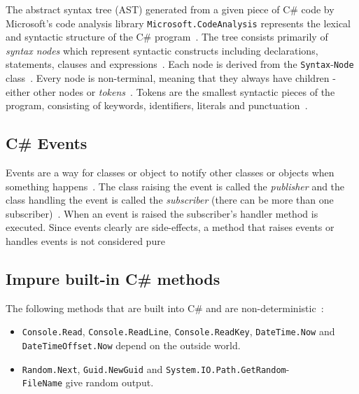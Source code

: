 \documentclass[a4paper,12pt]{article}
\begin{document}
The abstract syntax tree (AST) generated from a given piece of C\# code by Microsoft's code analysis library \texttt{Microsoft.CodeAnalysis} represents the lexical and syntactic structure of the C\# program~\cite{microsoft-work-with-syntax}. The tree consists primarily of \textit{syntax nodes} which represent syntactic constructs including declarations, statements, clauses and expressions~\cite{microsoft-work-with-syntax}. Each node is derived from the \texttt{Syntax}-\texttt{Node} class~\cite{microsoft-work-with-syntax}. Every node is non-terminal, meaning that they always have children - either other nodes or \textit{tokens}~\cite{microsoft-work-with-syntax}. Tokens are the smallest syntactic pieces of the program, consisting of keywords, identifiers, literals and punctuation~\cite{microsoft-work-with-syntax}.


\subsection{C\# Events} \label{sub:Events}
Events are a way for classes or object to notify other classes or objects when something happens~\cite{microsoft-events}. The class raising the event is called the \textit{publisher} and the class handling the event is called the \textit{subscriber} (there can be more than one subscriber)~\cite{microsoft-events}. When an event is raised the subscriber's handler method is executed. Since events clearly are side-effects, a method that raises events or handles events is not considered pure

\subsection{Impure built-in C\# methods} \label{sub:Impure-built-in-methods}
The following methods that are built into C\# and are non-deterministic~\cite{dixin2015}:

\begin{itemize}
  \item \texttt{Console.Read}, \texttt{Console.ReadLine}, \texttt{Console.ReadKey}, \texttt{DateTime\allowbreak.Now} and \texttt{DateTimeOffset.Now} depend on the outside world.
\item \texttt{Random.Next}, \texttt{Guid.NewGuid} and \texttt{System.IO.Path.GetRandom}-\\\texttt{\allowbreak FileName} give random output.
\end{itemize}
\end{document}
